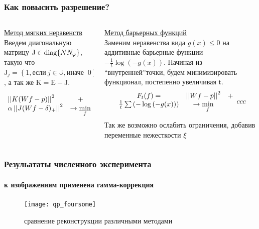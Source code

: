 \begingroup
\small
\begin{frame}
  \frametitle{Как повысить разрешение?}
  \begin{columns}[T, onlytextwidth]
  \hspace{-0.5cm}
  \begin{column}{0.5\textwidth}
    \underline{Метод мягких неравенств} \\ \vspace{0.5cm}
    Введем диагональную матрицу $\mathrm J \in \textup{diag}\{N N_\varphi\}$, такую что 
    $\mathrm J_{j} = \left\{1, \mbox{если}\ j \in \mathbb J, \mbox{иначе }\ 0\right\}$, а так же $\mathrm K = \mathrm E - \mathrm J$.


    \begin{equation} \notag
      \label{eq:soft-ineq}
      \begin{array}{lc}
      \left|\left| K(Wf - p) \right|\right|^2 & + \\
      \alpha \left|\left| J(Wf - \delta)_{+} \right|\right|^2  & \to \min\limits_f
      \end{array}
    \end{equation}
  \end{column}

  \begin{column}{0.5\textwidth}
    \underline{Метод барьерных функций} \\ \vspace{0.5cm}
    Заменим неравенства вида $g(x) \leq 0$ на аддитивные барьерные функции $-\frac 1 t \log{\left(-g(x)\right)}$.
    Начиная из ``внутренней''точки, будем минимизировать функционал, постепенно увеличивая t.
    $$
    \begin{array}{ccc}
      F_t(f) = & \left|\left| Wf - p \right|\right|^2 & + \\
     \frac 1 t \sum \left( -\log{\left(-g(x)\right)} \right) &\to \min\limits_f &
    \end{array}{ccc}
    $$

    Так же возможно ослабить ограничения, добавив переменные нежесткости $\xi$

  \end{column}
  \end{columns}
\end{frame}
\endgroup

\begin{frame}
\frametitle{Резульататы численного эксперимента}
\framesubtitle{к изображениям применена гамма-коррекция}

\begin{figure}
  \centering
  \vspace{-0.3cm}
  \texttt{[image: qp\_foursome]}
  \caption{сравнение реконструкции различными методами}
  \label{fig:sample}
\end{figure}

\end{frame}

